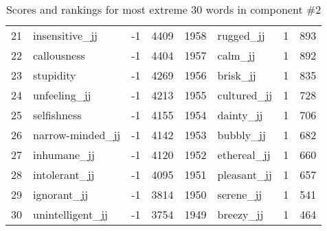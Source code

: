 \begin{table}[tbp]
\begin{tabular}{| rlr@{.}l | rlr@{.}l |}
    21 & insensitive\_jj & -1 & 4409    &    1958 & rugged\_jj & 1 & 893 \\
    22 & callousness & -1 & 4404    &    1957 & calm\_jj & 1 & 892 \\
    23 & stupidity & -1 & 4269    &    1956 & brisk\_jj & 1 & 835 \\
    24 & unfeeling\_jj & -1 & 4213    &    1955 & cultured\_jj & 1 & 728 \\
    25 & selfishness & -1 & 4155    &    1954 & dainty\_jj & 1 & 706 \\
    26 & narrow-minded\_jj & -1 & 4142    &    1953 & bubbly\_jj & 1 & 682 \\
    27 & inhumane\_jj & -1 & 4120    &    1952 & ethereal\_jj & 1 & 660 \\
    28 & intolerant\_jj & -1 & 4095    &    1951 & pleasant\_jj & 1 & 657 \\
    29 & ignorant\_jj & -1 & 3814    &    1950 & serene\_jj & 1 & 541 \\
    30 & unintelligent\_jj & -1 & 3754    &    1949 & breezy\_jj & 1 & 464 \\
    \hline
    \end{tabular}
    \caption{Scores and rankings for most extreme 30 words in component \#2} 
\end{table}
\clearpage
